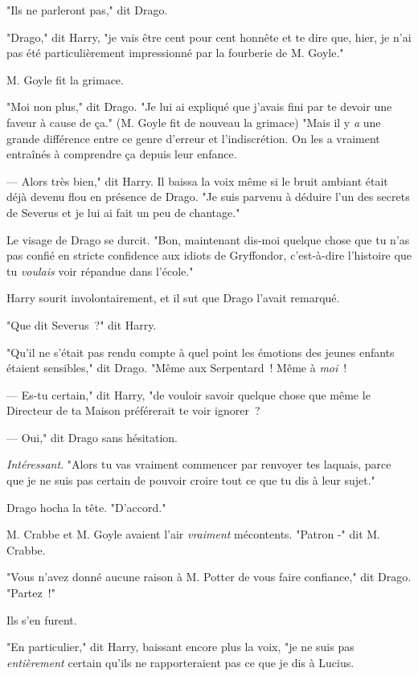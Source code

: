 "Ils ne parleront pas," dit Drago.

"Drago," dit Harry, "je vais être cent pour cent honnête et te dire que, hier, je n'ai pas été particulièrement impressionné par la fourberie de M. Goyle."

M. Goyle fit la grimace.

"Moi non plus," dit Drago. "Je lui ai expliqué que j'avais fini par te devoir une faveur à cause de ça." (M. Goyle fit de nouveau la grimace) "Mais il y \emph{a} une grande différence entre ce genre d'erreur et l'indiscrétion. On les a vraiment entraînés à comprendre ça depuis leur enfance.

--- Alors très bien," dit Harry. Il baissa la voix même si le bruit ambiant était déjà devenu flou en présence de Drago. "Je suis parvenu à déduire l'un des secrets de Severus et je lui ai fait un peu de chantage."

Le visage de Drago se durcit. "Bon, maintenant dis-moi quelque chose que tu n'as pas confié en stricte confidence aux idiots de Gryffondor, c'est-à-dire l'histoire que tu \emph{voulais} voir répandue dans l'école."

Harry sourit involontairement, et il sut que Drago l'avait remarqué.

"Que dit Severus~?" dit Harry.

"Qu'il ne s'était pas rendu compte à quel point les émotions des jeunes enfants étaient sensibles," dit Drago. "Même aux Serpentard~! Même à \emph{moi}~!

--- Es-tu certain," dit Harry, "de vouloir savoir quelque chose que même le Directeur de ta Maison préférerait te voir ignorer~?

--- Oui," dit Drago sans hésitation.

\emph{Intéressant}. "Alors tu vas vraiment commencer par renvoyer tes laquais, parce que je ne suis pas certain de pouvoir croire tout ce que tu dis à leur sujet."

Drago hocha la tête. "D'accord."

M. Crabbe et M. Goyle avaient l'air \emph{vraiment} mécontents. "Patron -" dit M. Crabbe.

"Vous n'avez donné aucune raison à M. Potter de vous faire confiance," dit Drago. "Partez~!"

Ils s'en furent.

"En particulier," dit Harry, baissant encore plus la voix, "je ne suis pas \emph{entièrement} certain qu'ils ne rapporteraient pas ce que je dis à Lucius.

